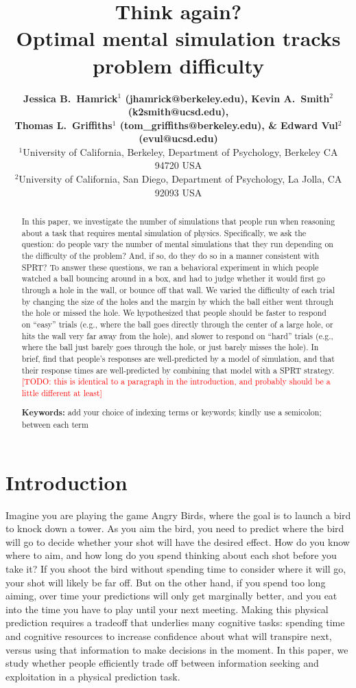 \documentclass[10pt,letterpaper]{article}
\title{Think again?\\ Optimal mental simulation tracks problem difficulty}
\author{{\large \bf Jessica B.~Hamrick$^1$ (jhamrick@berkeley.edu),
    Kevin A.~Smith$^2$ (k2smith@ucsd.edu),}\\
    {\large \bf Thomas L.~Griffiths$^1$ (tom\_griffiths@berkeley.edu),
      \& Edward Vul$^2$ (evul@ucsd.edu)}\\
    $^1$University of California, Berkeley, Department of Psychology, Berkeley CA 94720 USA\\
    $^2$University of California, San Diego, Department of Psychology, La Jolla, CA 92093 USA}
\newcommand{\TODO}[1]{\textcolor{red}{[TODO: #1]}}
\begin{document}
\maketitle

\begin{abstract}
In this paper, we investigate the number of simulations that people run when reasoning about a task that requires mental simulation of physics. Specifically, we ask the question: do people vary the number of mental simulations that they run depending on the difficulty of the problem? And, if so, do they do so in a manner consistent with SPRT? To answer these questions, we ran a behavioral experiment in which people watched a ball bouncing around in a box, and had to judge whether it would first go through a hole in the wall, or bounce off that wall. We varied the difficulty of each trial by changing the size of the holes and the margin by which the ball either went through the hole or missed the hole. We hypothesized that people should be faster to respond on ``easy'' trials (e.g., where the ball goes directly through the center of a large hole, or hits the wall very far away from the hole), and slower to respond on ``hard'' trials (e.g., where the ball just barely goes through the hole, or just barely misses the hole). In brief, find that people's responses are well-predicted by a model of simulation, and that their response times are well-predicted by combining that model with a SPRT strategy. \TODO{this is identical to a paragraph in the introduction, and probably should be a little different at least}

\textbf{Keywords:} 
add your choice of indexing terms or keywords; kindly use a
semicolon; between each term
\end{abstract}

\section{Introduction}

Imagine you are playing the game Angry Birds, where the goal is to launch a bird to knock down a tower. As you aim the bird, you need to predict where the bird will go to decide whether your shot will have the desired effect. How do you know where to aim, and how long do you spend thinking about each shot before you take it? If you shoot the bird without spending time to consider where it will go, your shot will likely be far off. But on the other hand, if you spend too long aiming, over time your predictions will only get marginally better, and you eat into the time you have to play until your next meeting. Making this physical prediction requires a tradeoff that underlies many cognitive tasks: spending time and cognitive resources to increase confidence about what will transpire next, versus using that information to make decisions in the moment. In this paper, we study whether people efficiently trade off between information seeking and exploitation in a physical prediction task.
\end{document}
